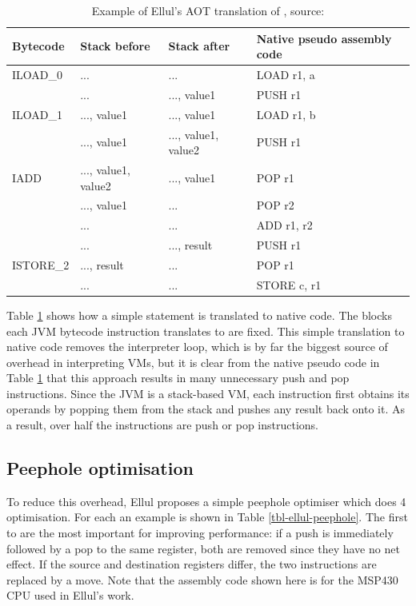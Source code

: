 \begin{table}
\caption[Example of Ellul's AOT translation of ]{Example of Ellul's AOT translation of , source: \cite{Ellul:2012thesis}}
\label{tbl-ellul-aot-example}
    \begin{tabular}{llll} %
    \toprule
    Bytecode  & Stack before        & Stack after         & Native pseudo assembly code \\
    \midrule
    \midrule
    ILOAD\_0  & ...                 & ...                 & LOAD r1, a \\
              & ...                 & ..., value1         & PUSH r1 \\
    ILOAD\_1  & ..., value1         & ..., value1         & LOAD r1, b \\
              & ..., value1         & ..., value1, value2 & PUSH r1 \\
    IADD      & ..., value1, value2 & ..., value1         & POP r1 \\
              & ..., value1         & ...                 & POP r2 \\
              & ...                 & ...                 & ADD r1, r2 \\
              & ...                 & ..., result         & PUSH r1 \\
    ISTORE\_2 & ..., result         & ...                 & POP r1 \\
              & ...                 & ...                 & STORE c, r1 \\
    \bottomrule
    \end{tabular}
\end{table}

Table \ref{tbl-ellul-aot-example} shows how a simple statement is translated to native code. The blocks each JVM bytecode instruction translates to are fixed. This simple translation to native code removes the interpreter loop, which is by far the biggest source of overhead in interpreting VMs, but it is clear from the native pseudo code in Table \ref{tbl-ellul-aot-example} that this approach results in many unnecessary push and pop instructions. Since the JVM is a stack-based VM, each instruction first obtains its operands by popping them from the stack and pushes any result back onto it. As a result, over half the instructions are push or pop instructions.

\subsection{Peephole optimisation}
To reduce this overhead, Ellul proposes a simple peephole optimiser \cite{Ellul:2012thesis} which does 4 optimisation. For each an example is shown in Table \ref{tbl-ellul-peephole}. The first to are the most important for improving performance: if a push is immediately followed by a pop to the same register, both are removed since they have no net effect. If the source and destination registers differ, the two instructions are replaced by a move. Note that the assembly code shown here is for the MSP430 CPU used in Ellul's work.

